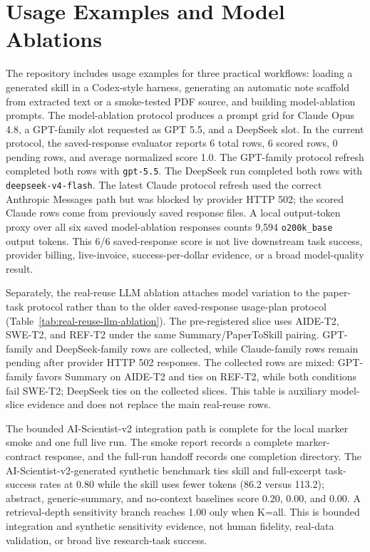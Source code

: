 \documentclass[letterpaper]{article}
\begin{document}
\section{Usage Examples and Model Ablations}

The repository includes usage examples for three practical workflows:
loading a generated skill in a Codex-style harness, generating an automatic
note scaffold from extracted text or a smoke-tested PDF source, and building
model-ablation prompts. The
model-ablation protocol produces a prompt grid for Claude Opus 4.8, a
GPT-family slot requested as GPT 5.5, and a DeepSeek slot. In the current
protocol, the saved-response evaluator reports 6 total rows, 6 scored rows, 0
pending rows, and average normalized score 1.0. The GPT-family protocol refresh
completed both rows with \texttt{gpt-5.5}. The DeepSeek run completed both rows
with \texttt{deepseek-v4-flash}. The latest Claude protocol refresh used the
correct Anthropic Messages path but was blocked by provider HTTP 502; the
scored Claude rows come from previously saved response files. A local
output-token proxy over all six saved model-ablation responses counts 9,594
\texttt{o200k\_base} output tokens. This 6/6 saved-response score is not live
downstream task success, provider billing, live-invoice, success-per-dollar
evidence, or a broad model-quality result.

Separately, the real-reuse LLM ablation attaches model variation to the
paper-task protocol rather than to the older saved-response usage-plan
protocol (Table~\ref{tab:real-reuse-llm-ablation}). The pre-registered slice
uses AIDE-T2, SWE-T2, and REF-T2 under the same Summary/PaperToSkill pairing.
GPT-family and DeepSeek-family rows are collected, while Claude-family rows
remain pending after provider HTTP 502 responses. The collected rows are mixed:
GPT-family favors Summary on AIDE-T2 and ties on REF-T2, while both conditions
fail SWE-T2; DeepSeek ties on the collected slices. This table is auxiliary
model-slice evidence and does not replace the main real-reuse rows.

The bounded AI-Scientist-v2 integration path is complete for the local marker
smoke and one full live run. The smoke report records a complete marker-contract
response, and the full-run handoff records one completion directory. The
AI-Scientist-v2-generated synthetic benchmark ties skill and full-excerpt
task-success rates at 0.80 while the skill uses fewer tokens (86.2 versus
113.2); abstract, generic-summary, and no-context baselines score 0.20, 0.00,
and 0.00. A retrieval-depth sensitivity branch reaches 1.00 only when K=all.
This is bounded integration and synthetic sensitivity evidence, not human
fidelity, real-data validation, or broad live research-task success.
\end{document}
